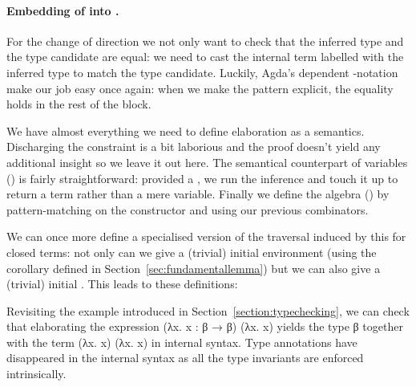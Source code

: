 \paragraph*{Embedding of  into .} For the change of direction
 we not only want to check that the inferred type and the type candidate
are equal: we need to cast the internal term labelled with the inferred type to
match the type candidate. Luckily, Agda's dependent -notation make our
job easy once again: when we make the pattern  explicit, the equality holds
in the rest of the block.
\begin{agdasnippet}
\end{agdasnippet}

We have almost everything we need to define elaboration as a semantics. Discharging
the  constraint is a bit laborious and the proof doesn't
yield any additional insight so we leave it out here. The semantical counterpart of
variables () is fairly straightforward: provided a , we run the
inference and touch it up to return a term rather than a mere variable. Finally we
define the algebra () by pattern-matching on the constructor and using our
previous combinators.

\begin{agdasnippet}
\end{agdasnippet}

We can once more define a specialised version of the traversal induced by this
 for closed terms: not only can we give a (trivial) initial
environment (using the  corollary defined in Section~\ref{sec:fundamentallemma})
but we can also give a (trivial) initial . This leads to these
definitions:

\noindent
\begin{minipage}{\textwidth}
\begin{minipage}{0.55\textwidth}
\end{minipage}
\begin{minipage}{0.44\textwidth}
\end{minipage}
\end{minipage}

Revisiting the example introduced in Section~\ref{section:typechecking},
we can check that elaborating the expression {(λx. x : β → β) (λx. x)}
yields the type {β} together with the term {(λx. x) (λx. x)} in internal
syntax. Type annotations have disappeared in the internal syntax as all
the type invariants are enforced intrinsically.

\begin{agdasnippet}
\end{agdasnippet}
